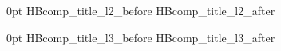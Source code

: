 \titleformat{\subsection}{\normalfont}{}{0pt}{\HBTitleLevelTwo}
\titlespacing*{\subsection}
  {0pt}
  {\csname HBcomp_title_l2_before\endcsname}
  {\csname HBcomp_title_l2_after\endcsname}

\titleformat{\subsubsection}{\normalfont}{}{0pt}{\HBTitleLevelThree}
\titlespacing*{\subsubsection}
  {0pt}
  {\csname HBcomp_title_l3_before\endcsname}
  {\csname HBcomp_title_l3_after\endcsname}
